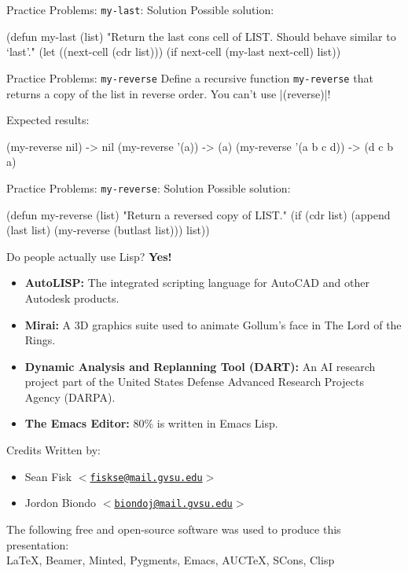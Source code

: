 \documentclass{beamer}
\newcommand{\mailtohref}[1]{\href{mailto:#1}{$<$\nolinkurl{#1}$>$}}
\begin{document}

\begin{frame}[fragile]{Practice Problems: \texttt{my-last}: Solution}
  Possible solution:
  \begin{clcode}
(defun my-last (list)
  "Return the last cons cell of LIST.
Should behave similar to `last'."
  (let ((next-cell (cdr list)))
    (if next-cell
        (my-last next-cell)
      list))
  \end{clcode}
\end{frame}

\begin{frame}[fragile]{Practice Problems: \texttt{my-reverse}}
  Define a recursive function \texttt{my-reverse} that returns a copy
  of the list in reverse order. You can't use \cl|(reverse)|!

Expected results:
\begin{clcode}
  (my-reverse nil) -> nil
  (my-reverse '(a)) -> (a)
  (my-reverse '(a b c d)) -> (d c b a)
\end{clcode}
\end{frame}

\begin{frame}[fragile]{Practice Problems: \texttt{my-reverse}: Solution}
  Possible solution:
  \begin{clcode}
(defun my-reverse (list)
  "Return a reversed copy of LIST."
  (if (cdr list)
      (append (last list) (my-reverse (butlast list)))
    list))
  \end{clcode}
\end{frame}

\begin{frame}{Do people actually use Lisp?}
  \textbf{Yes!}
  \begin{itemize}
  \item \textbf{AutoLISP:} The integrated scripting language for AutoCAD and
    other Autodesk products.
  \item \textbf{Mirai:} A 3D graphics suite used to animate Gollum's face in The Lord of the Rings.
  \item \textbf{Dynamic Analysis and Replanning Tool (DART):} An AI research
    project part of the United States Defense Advanced Research
    Projects Agency (DARPA).
  \item \textbf{The Emacs Editor:} 80\% is written in Emacs Lisp.
  \end{itemize}
\end{frame}

\begin{frame}{Credits}
  Written by:
  \begin{itemize}
  \item Sean Fisk \mailtohref{fiskse@mail.gvsu.edu}
  \item Jordon Biondo \mailtohref{biondoj@mail.gvsu.edu}
  \end{itemize}
  The following free and open-source software was used to produce this presentation: \\
  \LaTeX, Beamer, Minted, Pygments, Emacs, AUCTeX, SCons, Clisp
\end{frame}
\end{document}

